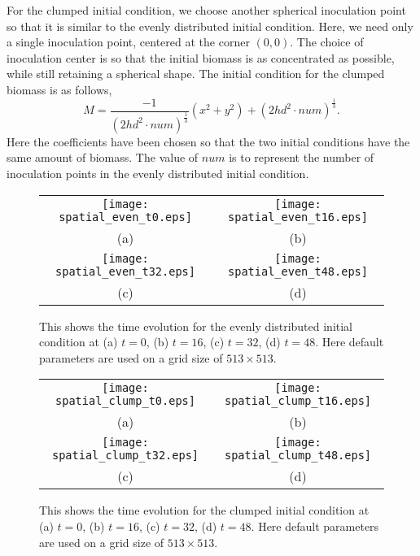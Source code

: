 
For the clumped initial condition, we choose another spherical inoculation point so that it is similar to the evenly distributed initial condition.
Here, we need only a single inoculation point, centered at the corner $(0,0)$.
The choice of inoculation center is so that the initial biomass is as concentrated as possible, while still retaining a spherical shape.
The initial condition for the clumped biomass is as follows, 
\begin{equation}
M = \frac{-1}{(2hd^2\cdot num)^{\frac{1}{3}}} (x^2 + y^2) + (2hd^2\cdot num)^{\frac{1}{3}}.
\end{equation}
Here the coefficients have been chosen so that the two initial conditions have the same amount of biomass.
The value of $num$ is to represent the number of inoculation points in the evenly distributed initial condition.

\begin{figure}
  \centering 
  \begin{tabular}{c c}
    \texttt{[image: spatial\_even\_t0.eps]} &
    \texttt{[image: spatial\_even\_t16.eps]} \\
    (a) & (b) \\
    \texttt{[image: spatial\_even\_t32.eps]} &
    \texttt{[image: spatial\_even\_t48.eps]} \\
    (c) & (d) 
  \end{tabular}
  \caption{This shows the time evolution for the evenly distributed initial condition at (a) $t=0$, (b) $t=16$, (c) $t=32$, (d) $t=48$.
    Here default parameters are used on a grid size of $513 \times 513$.
    }
  \label{fig:spatial_even}
\end{figure}

\begin{figure}
  \centering 
  \begin{tabular}{c c}
    \texttt{[image: spatial\_clump\_t0.eps]} &
    \texttt{[image: spatial\_clump\_t16.eps]} \\
    (a) & (b) \\
    \texttt{[image: spatial\_clump\_t32.eps]} &
    \texttt{[image: spatial\_clump\_t48.eps]} \\
    (c) & (d) 
  \end{tabular}
  \caption{This shows the time evolution for the clumped initial condition at (a) $t=0$, (b) $t=16$, (c) $t=32$, (d) $t=48$.
    Here default parameters are used on a grid size of $513 \times 513$.
    }
  \label{fig:spatial_clump}
\end{figure}

